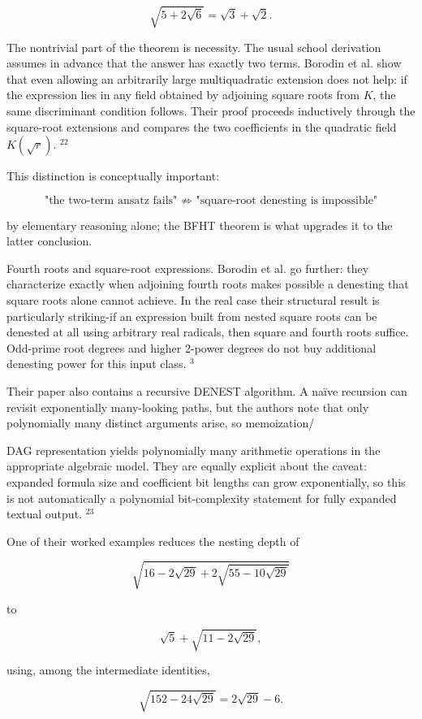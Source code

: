\documentclass[10pt]{article}
\begin{document}
$$
\sqrt{5+2 \sqrt{6}}=\sqrt{3}+\sqrt{2} .
$$

The nontrivial part of the theorem is necessity. The usual school derivation assumes in advance that the answer has exactly two terms. Borodin et al. show that even allowing an arbitrarily large multiquadratic extension does not help: if the expression lies in any field obtained by adjoining square roots from $K$, the same discriminant condition follows. Their proof proceeds inductively through the square-root extensions and compares the two coefficients in the quadratic field $K(\sqrt{r})$. ${ }^{22}$

This distinction is conceptually important:

$$
\text { "the two-term ansatz fails" } \nRightarrow \text { "square-root denesting is impossible" }
$$

by elementary reasoning alone; the BFHT theorem is what upgrades it to the latter conclusion.

Fourth roots and square-root expressions. Borodin et al. go further: they characterize exactly when adjoining fourth roots makes possible a denesting that square roots alone cannot achieve. In the real case their structural result is particularly striking-if an expression built from nested square roots can be denested at all using arbitrary real radicals, then square and fourth roots suffice. Odd-prime root degrees and higher 2-power degrees do not buy additional denesting power for this input class. ${ }^{3}$

Their paper also contains a recursive DENEST algorithm. A naïve recursion can revisit exponentially many-looking paths, but the authors note that only polynomially many distinct arguments arise, so memoization/

DAG representation yields polynomially many arithmetic operations in the appropriate algebraic model. They are equally explicit about the caveat: expanded formula size and coefficient bit lengths can grow exponentially, so this is not automatically a polynomial bit-complexity statement for fully expanded textual output. ${ }^{23}$

One of their worked examples reduces the nesting depth of

$$
\sqrt{16-2 \sqrt{29}+2 \sqrt{55-10 \sqrt{29}}}
$$

to

$$
\sqrt{5}+\sqrt{11-2 \sqrt{29}},
$$

using, among the intermediate identities,

$$
\sqrt{152-24 \sqrt{29}}=2 \sqrt{29}-6 .
$$
\end{document}

